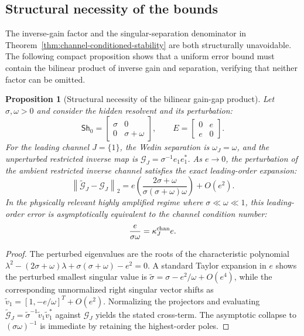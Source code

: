 \documentclass[review]{siamart220329}
\newtheorem{proposition}[theorem]{Proposition}
\theoremstyle{definition}
\theoremstyle{remark}
\newcommand{\Sh}{\mathsf{Sh}}
\newcommand{\norm}[1]{\left\lVert #1\right\rVert}
\begin{document}
\subsection{Structural necessity of the bounds}\label{sec:structural-necessity}
The inverse-gain factor and the singular-separation denominator in Theorem~\ref{thm:channel-conditioned-stability} are both structurally unavoidable. The following compact proposition shows that a uniform error bound must contain the bilinear product of inverse gain and separation, verifying that neither factor can be omitted.

\begin{proposition}[Structural necessity of the bilinear gain-gap product]
\label{prop:structural-necessity}
Let $\sigma, \omega > 0$ and consider the hidden resolvent and its perturbation:
\begin{equation}
    \Sh_0 = \begin{bmatrix} \sigma & 0 \\ 0 & \sigma+\omega \end{bmatrix},
    \qquad
    E = \begin{bmatrix} 0 & e \\ e & 0 \end{bmatrix}.
\end{equation}
For the leading channel $J=\{1\}$, the Wedin separation is $\omega_J = \omega$, and the unperturbed restricted inverse map is $\mathcal{G}_J = \sigma^{-1} e_1 e_1^*$. 
As $e \to 0$, the perturbation of the ambient restricted inverse channel satisfies the exact leading-order expansion:
\begin{equation}
    \norm{\widetilde{\mathcal{G}}_J - \mathcal{G}_J}_2 = e \left( \frac{2\sigma+\omega}{\sigma(\sigma+\omega)\omega} \right) + O(e^2).
\end{equation}
In the physically relevant highly amplified regime where $\sigma \ll \omega \ll 1$, this leading-order error is asymptotically equivalent to the channel condition number:
\begin{equation}
    \frac{e}{\sigma \omega} = \kappa_J^{\rm chan} e.
\end{equation}
\end{proposition}

\begin{proof}
The perturbed eigenvalues are the roots of the characteristic polynomial $\lambda^2 - (2\sigma+\omega)\lambda + \sigma(\sigma+\omega)-e^2=0$. A standard Taylor expansion in $e$ shows the perturbed smallest singular value is $\tilde{\sigma} = \sigma - e^2/\omega + O(e^4)$, while the corresponding unnormalized right singular vector shifts as $\tilde{v}_1 = [1, -e/\omega]^T + O(e^2)$. Normalizing the projectors and evaluating $\widetilde{\mathcal{G}}_J = \tilde{\sigma}^{-1} \tilde{v}_1 \tilde{v}_1^*$ against $\mathcal{G}_J$ yields the stated cross-term. The asymptotic collapse to $(\sigma \omega)^{-1}$ is immediate by retaining the highest-order poles.
\end{proof}
\end{document}
